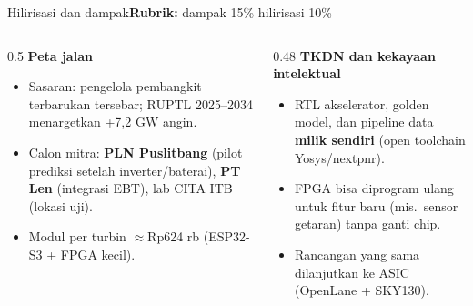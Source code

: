 \documentclass[aspectratio=169, 10pt]{beamer}
\newcommand{\kriteria}[1]{\hfill{\scriptsize\mdseries\color{krem!75}\textbf{Rubrik:} #1}}
\begin{document}
\begin{frame}[label=hilirisasi]{Hilirisasi dan dampak\kriteria{dampak 15\% \textbullet{} hilirisasi 10\%}}
\begin{columns}[T]
\begin{column}{0.5\linewidth}
\textbf{Peta jalan}
\begin{center}
\end{center}
\small
\begin{itemize}
  \item Sasaran: pengelola pembangkit terbarukan tersebar; RUPTL 2025--2034 menargetkan +7,2 GW angin.
  \item Calon mitra: \textbf{PLN Puslitbang} (pilot prediksi setelah inverter/baterai), \textbf{PT Len} (integrasi EBT), lab CITA ITB (lokasi uji).
  \item Modul per turbin $\approx$Rp624 rb (ESP32-S3 + FPGA kecil).
\end{itemize}
\end{column}
\begin{column}{0.48\linewidth}
\textbf{TKDN dan kekayaan intelektual}
\small
\begin{itemize}
  \item RTL akselerator, golden model, dan pipeline data \textbf{milik sendiri} (open toolchain Yosys/nextpnr).
  \item FPGA bisa diprogram ulang untuk fitur baru (mis.\ sensor getaran) tanpa ganti chip.
  \item Rancangan yang sama dilanjutkan ke ASIC (OpenLane + SKY130).
\end{itemize}
\end{column}
\end{columns}
\end{frame}
\end{document}

